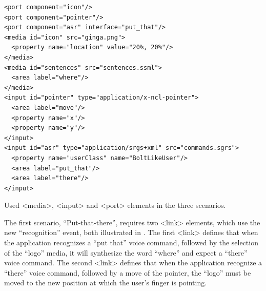 \documentclass[
  doutorado,
  american
]{ThesisPUC}
\newcommand{\captionvspace}{\vspace{-1.3em}}
\begin{document}
\begin{verbatim}
<port component="icon"/>
<port component="pointer"/>
<port component="asr" interface="put_that"/>
<media id="icon" src="ginga.png">
  <property name="location" value="20%, 20%"/>
</media>
<media id="sentences" src="sentences.ssml">
  <area label="where"/>
</media>
<input id="pointer" type="application/x-ncl-pointer">
  <area label="move"/>
  <property name="x"/>
  <property name="y"/>
</input>
<input id="asr" type="application/srgs+xml" src="commands.sgrs">
  <property name="userClass" name="BoltLikeUser"/>
  <area label="put_that"/>
  <area label="there"/>
</input>
\end{verbatim}
\captionvspace
\begin{listing}[!ht]
\caption{Used <media>, <input> and <port> elements in the three scenarios.}
\label{list:annexb3}
\end{listing}

The first scenario, “Put-that-there”, requires two <link> elements, which use
the new “recognition” event, both illustrated in \label{list:annexb4}. The first
<link> defines that when the application recognizes a “put that” voice command,
followed by the selection of the “logo” media, it will synthesize the word
“where” and expect a “there” voice command. The second <link> defines that when
the application recognize a “there” voice command, followed by a move of the
pointer, the “logo” must be moved to the new position at which the user’s finger
is pointing.
\end{document}
